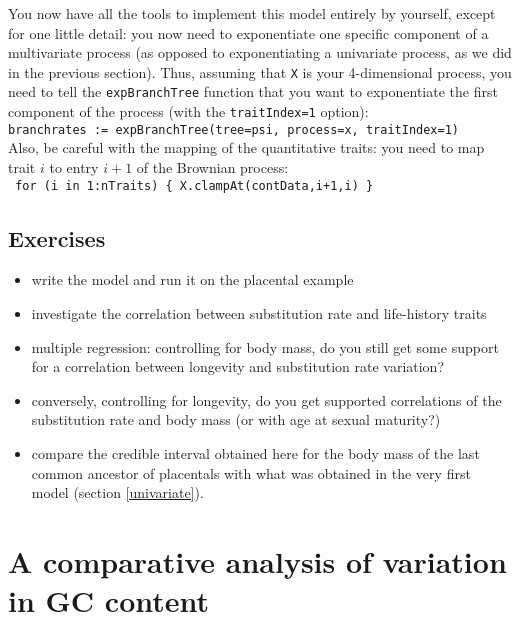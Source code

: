 \documentclass[usletter]{article}
\newcommand{\cmd}[1]{\texttt{#1}}
\begin{document}
You now have all the tools to implement this model entirely by yourself, except for one little detail: you now need to exponentiate one specific component of a multivariate process (as opposed to exponentiating a univariate process, as we did in the previous section). Thus, assuming that \cmd{X} is your 4-dimensional process, you need to tell the \cmd{expBranchTree} function that you want to exponentiate the first component of the process (with the \cmd{traitIndex=1} option):
\\
\cmd{branchrates := expBranchTree(tree=psi, process=x, traitIndex=1)}
\\
Also, be careful with the mapping of the quantitative traits: you need to map trait $i$ to entry $i+1$ of the Brownian process:
\\
\cmd{
for (i in 1:nTraits)    \{
        X.clampAt(contData,i+1,i)
\}
}
\\



\subsection*{Exercises}

\begin{itemize}
\item
write the model and run it on the placental example
\item
investigate the correlation between substitution rate and life-history traits
\item
multiple regression: controlling for body mass, do you still get some support for a correlation between longevity and substitution rate variation?
\item
conversely, controlling for longevity, do you get supported correlations of the substitution rate and body mass (or with age at sexual maturity?)
\item
compare the credible interval obtained here for the body mass of the last common ancestor of placentals with what was obtained in the very first model (section \ref{univariate}).
\end{itemize}

\section{A comparative analysis of variation in GC content}
\end{document}
